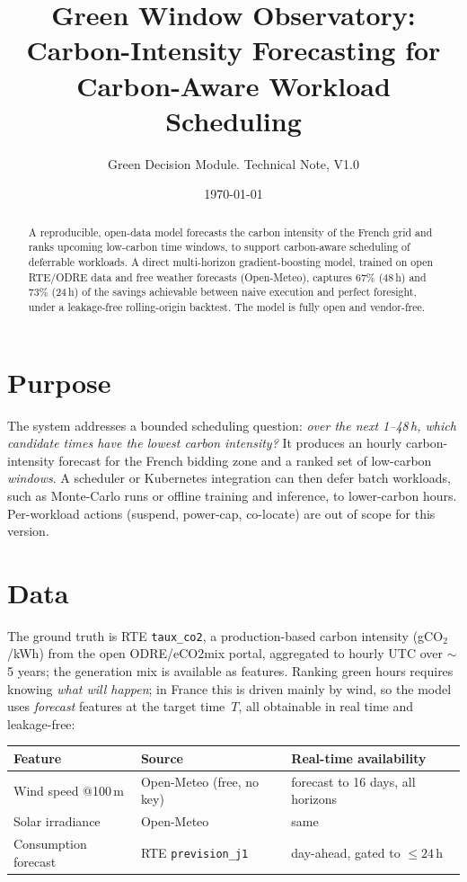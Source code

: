 \documentclass[10pt,a4paper]{article}
\title{\vspace{-2.2em}\textbf{Green Window Observatory:\\[-0.1em]
Carbon-Intensity Forecasting for Carbon-Aware Workload Scheduling}}
\author{\normalsize Green Decision Module. Technical Note, V1.0}
\date{\vspace{-1em}\small\today}
\begin{document}
\maketitle
\vspace{-2em}

\begin{abstract}\small\noindent
A reproducible, open-data model forecasts the carbon intensity of the French
grid and ranks upcoming low-carbon time windows, to support carbon-aware
scheduling of deferrable workloads. A direct multi-horizon gradient-boosting
model, trained on open RTE/ODRE data and free weather forecasts (Open-Meteo),
captures 67\% (48\,h) and 73\% (24\,h) of the savings achievable between naive
execution and perfect foresight, under a leakage-free rolling-origin backtest.
The model is fully open and vendor-free.
\end{abstract}

\section{Purpose}
The system addresses a bounded scheduling question: \emph{over the next
1--48\,h, which candidate times have the lowest carbon intensity?} It produces
an hourly carbon-intensity forecast for the French bidding zone and a ranked set
of low-carbon \emph{windows}. A scheduler or Kubernetes integration can then
defer batch workloads, such as Monte-Carlo runs or offline training and
inference, to lower-carbon hours. Per-workload actions (suspend, power-cap,
co-locate) are out of scope for this version.

\section{Data}
The ground truth is RTE \texttt{taux\_co2}, a production-based carbon intensity
(gCO$_2$/kWh) from the open ODRE/eCO2mix portal, aggregated to hourly UTC over
$\sim$5 years; the generation mix is available as features. Ranking green hours
requires knowing \emph{what will happen}; in France this is driven mainly by
wind, so the model uses \emph{forecast} features at the target time~$T$, all
obtainable in real time and leakage-free:

\begin{center}\small
\begin{tabular}{@{}lll@{}}
\toprule
Feature & Source & Real-time availability \\
\midrule
Wind speed @100\,m & Open-Meteo (free, no key) & forecast to 16 days, all horizons \\
Solar irradiance & Open-Meteo & same \\
Consumption forecast & RTE \texttt{prevision\_j1} & day-ahead, gated to $\le 24$\,h \\
\bottomrule
\end{tabular}
\end{center}
\end{document}
